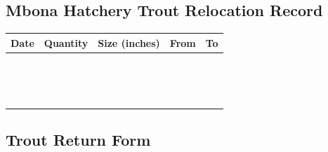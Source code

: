 \begin{appendices}
\subsection{Mbona Hatchery Trout Relocation Record}
\renewcommand{\arraystretch}{2.0}
\vspace{1cm}
 \begin{tabular}{|c|c|c|c|c|}
 \hline
    Date \hspace{2cm} & Quantity & Size (inches)  & From \hspace{2.5cm} & To \hspace{2.5cm} \\ \hline
             &               &          &          &      \\ \hline
             &               &          &          &      \\ \hline
           &               &          &          &      \\ \hline
           &               &          &          &      \\ \hline
           &               &          &          &      \\ \hline
           &               &          &          &      \\ \hline
           &               &          &          &      \\ \hline
           &               &          &          &      \\ \hline
           &               &          &          &      \\ \hline
           &               &          &          &      \\ \hline
           &               &          &          &      \\ \hline
           &               &          &          &      \\ \hline
           &               &          &          &      \\ \hline
           &               &          &          &      \\ \hline
           &               &          &          &      \\ \hline
  \end{tabular} 
 

\pagestyle{plain}
\newpage

\subsection{Trout Return Form}


\end{appendices}
